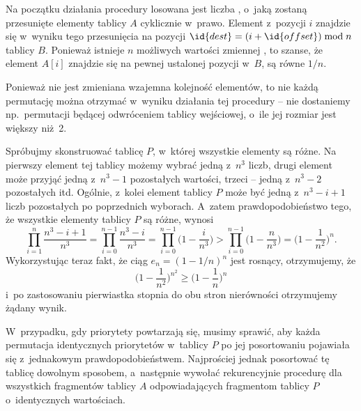 \exercise %
Na początku działania procedury losowana jest liczba , o~jaką zostaną przesunięte elementy tablicy $A$ cyklicznie w~prawo. Element z~pozycji $i$ znajdzie się w~wyniku tego przesunięcia na pozycji $\id{dest}=(i+\id{offset})\bmod n$ tablicy $B$. Ponieważ istnieje $n$ możliwych wartości zmiennej , to szanse, że element $A[i]$ znajdzie się na pewnej ustalonej pozycji w~$B$, są równe $1/n$.

Ponieważ nie jest zmieniana wzajemna kolejność elementów, to nie każdą permutację można otrzymać w~wyniku działania tej procedury -- nie dostaniemy np.\ permutacji będącej odwróceniem tablicy wejściowej, o~ile jej rozmiar jest większy niż~2.

\exercise %
Spróbujmy skonstruować tablicę $P$, w~której wszystkie elementy są różne. Na pierwszy element tej tablicy możemy wybrać jedną z~$n^3$ liczb, drugi element może przyjąć jedną z~$n^3-1$ pozostałych wartości, trzeci -- jedną z~$n^3-2$ pozostałych itd. Ogólnie,  z~kolei element tablicy $P$ może być jedną z~$n^3-i+1$ liczb pozostałych po poprzednich wyborach. A~zatem prawdopodobieństwo tego, że wszystkie elementy tablicy $P$ są różne, wynosi
\[
	\prod_{i=1}^n\frac{n^3-i+1}{n^3} = \prod_{i=0}^{n-1}\frac{n^3-i}{n^3} = \prod_{i=0}^{n-1}\biggl(1-\frac{i}{n^3}\biggr) > \prod_{i=0}^{n-1}\biggl(1-\frac{n}{n^3}\biggr) = \biggl(1-\frac{1}{n^2}\biggr)^n.
\]
Wykorzystując teraz fakt, że ciąg $e_n={(1-1/n)}^n$ jest rosnący, otrzymujemy, że
\[
	\biggl(1-\frac{1}{n^2}\biggr)^{n^2} \ge \biggl(1-\frac{1}{n}\biggr)^n
\]
i~po zastosowaniu pierwiastka  stopnia do obu stron nierówności otrzymujemy żądany wynik.

\exercise %
W~przypadku, gdy priorytety powtarzają się, musimy sprawić, aby każda permutacja identycznych priorytetów w~tablicy $P$ po jej posortowaniu pojawiała się z~jednakowym prawdopodobieństwem. Najprościej jednak posortować tę tablicę dowolnym sposobem, a~następnie wywołać rekurencyjnie procedurę  dla wszystkich fragmentów tablicy $A$ odpowiadających fragmentom tablicy $P$ o~identycznych wartościach.

